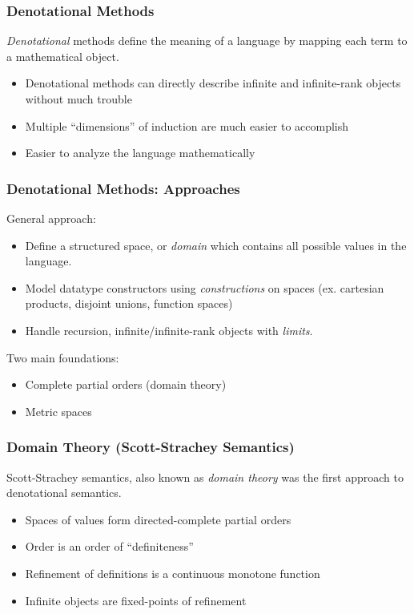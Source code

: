 \documentclass{beamer}
\begin{document}
\begin{frame}
  \frametitle{Denotational Methods}
  \emph{Denotational} methods define the meaning of a language by
  mapping each term to a mathematical object.
  \begin{itemize}
    \item Denotational methods can directly describe infinite and
      infinite-rank objects without much trouble
    \item Multiple ``dimensions'' of induction are much easier to accomplish
    \item Easier to analyze the language mathematically
  \end{itemize}
\end{frame}
\begin{frame}
  \frametitle{Denotational Methods: Approaches}
  General approach:
  \begin{itemize}
    \item Define a structured space, or \emph{domain} which contains
      all possible values in the language.
    \item Model datatype constructors using \emph{constructions} on
      spaces (ex. cartesian products, disjoint unions, function
      spaces)
    \item Handle recursion, infinite/infinite-rank objects with
      \emph{limits}.
  \end{itemize}
  Two main foundations:
  \begin{itemize}
    \item Complete partial orders (domain theory)
    \item Metric spaces
  \end{itemize}
\end{frame}

\begin{frame}
  \frametitle{Domain Theory (Scott-Strachey Semantics)}
  Scott-Strachey semantics, also known as \emph{domain theory} was the
  first approach to denotational semantics.
  \begin{itemize}
    \item Spaces of values form directed-complete partial orders
    \item Order is an order of ``definiteness''
    \item Refinement of definitions is a continuous monotone function
    \item Infinite objects are fixed-points of refinement
  \end{itemize}
\end{frame}
\end{document}
